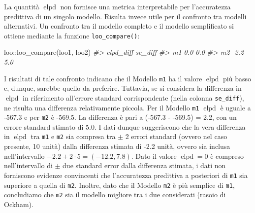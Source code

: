 \documentclass[
  10pt,
  italian,
  a4paper,
  extrafontsizes,onecolumn,openright
  ]{memoir}
\newenvironment{Shaded}{\begin{snugshade}}{\end{snugshade}}
\newcommand{\CommentTok}[1]{\textcolor[rgb]{0.56,0.35,0.01}{\textit{#1}}}
\newcommand{\DecValTok}[1]{\textcolor[rgb]{0.00,0.00,0.81}{#1}}
\newcommand{\FunctionTok}[1]{\textcolor[rgb]{0.00,0.00,0.00}{#1}}
\newcommand{\NormalTok}[1]{#1}
\newcommand{\OtherTok}[1]{\textcolor[rgb]{0.56,0.35,0.01}{#1}}
\newcommand{\SpecialCharTok}[1]{\textcolor[rgb]{0.00,0.00,0.00}{#1}}
\DeclareMathOperator{\elpd}{elpd} %
\theoremstyle{definition}
\theoremstyle{definition}
\theoremstyle{definition}
\theoremstyle{definition}
\theoremstyle{remark}
\begin{document}
\begin{Shaded}
\end{Shaded}

\noindent
La quantità \(\elpd\) non fornisce una metrica interpretabile per l'accuratezza predittiva di un singolo modello. Risulta invece utile per il confronto tra modelli alternativi. Un confronto tra il modello completo e il modello semplificato si ottiene mediante la funzione \texttt{loo\_compare()}:

\begin{Shaded}
\begin{Highlighting}[]
\NormalTok{loo}\SpecialCharTok{::}\FunctionTok{loo\_compare}\NormalTok{(loo1, loo2)}
\CommentTok{\#\textgreater{}    elpd\_diff se\_diff}
\CommentTok{\#\textgreater{} m1  0.0       0.0   }
\CommentTok{\#\textgreater{} m2 {-}2.2       5.0}
\end{Highlighting}
\end{Shaded}

\noindent
I risultati di tale confronto indicano che il Modello \texttt{m1} ha il valore \(\elpd\) più basso e, dunque, sarebbe quello da preferire. Tuttavia, se si considera la differenza in \(\elpd\) in riferimento all'errore standard corrispondente (nella colonna \texttt{se\_diff}), ne risulta una differenza relativamente piccola. Per il Modello \texttt{m1} \(\elpd\) è uguale a -567.3 e per \texttt{m2} è -569.5. La differenza è pari a (-567.3 - -569.5) = 2.2, con un errore standard stimato di 5.0. I dati dunque suggeriscono che la vera differenza in \(\elpd\) tra \texttt{m1} e \texttt{m2} sia compresa tra \(\pm\) 2 errori standard (ovvero nel caso presente, 10 unità) dalla differenza stimata di -2.2 unità, ovvero sia inclusa nell'intervallo \(-2.2 \pm 2 \cdot 5 = (-12.2, 7.8)\). Dato il valore \(\elpd = 0\) è compreso nell'intervallo di \(\pm\) due standard error dalla differenza stimata, i dati non forniscono evidenze convincenti che l'accuratezza predittiva a posteriori di \texttt{m1} sia superiore a quella di \texttt{m2}. Inoltre, dato che il Modello \texttt{m2} è più semplice di \texttt{m1}, concludiamo che \texttt{m2} sia il modello migliore tra i due considerati (rasoio di Ockham).
\end{document}
